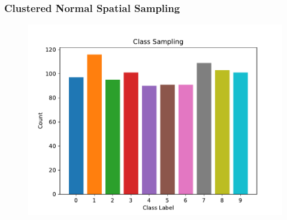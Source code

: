 \documentclass[10pt, usenames, dvipsnames, table]{beamer}
\begin{document}
\begin{frame}
  \frametitle{Clustered Normal Spatial Sampling}
  \begin{figure}
    \centering
    \includegraphics[width=\linewidth]
    {models/mnist_student_e300_L2_b64/multi-normal-cluster_sampling_distribution_1000}
    \caption{}
    \label{}
  \end{figure}
\end{frame}


\end{document}
